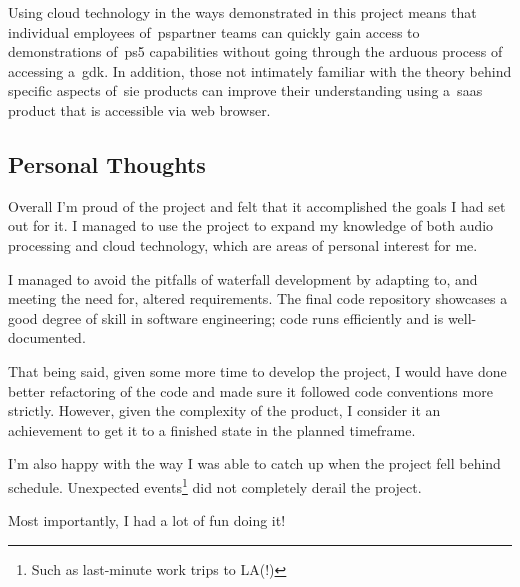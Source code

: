 Using cloud technology in the ways
demonstrated in this project means that individual employees of~\gls{pspartner} teams can quickly gain access to demonstrations of~\gls{ps5} capabilities
without going through the arduous process
of accessing a~\gls{gdk}.
In addition,
those not intimately familiar with the theory behind specific aspects of~\gls{sie} products can improve their understanding
using a~\gls{saas} product that is accessible via web browser.

\subsection{Personal Thoughts}\label{subsec:personal-thoughts}

Overall I'm proud of the project and felt that it accomplished the goals I had set out for it.
I managed to use the project to expand my knowledge of both audio processing and cloud technology,
which are areas of personal interest for me.

I managed to avoid the pitfalls of waterfall development by adapting to,
and meeting the need for, altered requirements.
The final code repository showcases a good degree of skill in software engineering;
code runs efficiently and is well-documented.

That being said, given some more time to develop the project, I would have done better
refactoring of the code and made sure it followed code conventions more strictly.
However, given the complexity of the product,
I consider it an achievement to get it to a finished state in the planned timeframe.

I'm also happy with the way I was able to catch up when the project fell behind schedule.
Unexpected events\footnote{Such as last-minute work trips to LA(!)} did not completely derail the project.

Most importantly, I had a lot of fun doing it!
